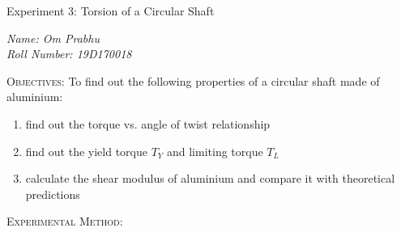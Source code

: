 \documentclass[a4paper, 11pt]{article}
\begin{document}
\begin{center}
	{\Large \sc Experiment 3: Torsion of a Circular Shaft}
\end{center}
\textit{Name: Om Prabhu\\
Roll Number: 19D170018}
\vspace{-1.5mm}

\hrulefill
\vspace{2mm}

\textsc{Objectives:} To find out the following properties of a circular shaft made of aluminium:
\vspace{-2mm}

\begin{enumerate}[label=(\alph*)]
	\itemsep-0.2em
	\item find out the torque vs. angle of twist relationship
	\item find out the yield torque $T_Y$ and limiting torque $T_L$
	\item calculate the shear modulus of aluminium and compare it with theoretical predictions
\end{enumerate}
\textsc{Experimental Method:}
\vspace{-2mm}
\end{document}

